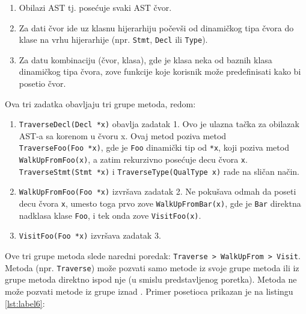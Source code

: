 \documentclass[12pt,oneside]{memoir}
\begin{document}
\begin{enumerate}
\item Obilazi AST tj. posećuje svaki AST čvor.
\item Za dati čvor ide uz klasnu hijerarhiju počevši od dinamičkog tipa čvora do klase na vrhu hijerarhije (npr. \lstinline{Stmt}, \lstinline{Decl} ili \lstinline{Type}).
\item Za datu kombinaciju (čvor, klasa), gde je klasa neka od baznih klasa dinamičkog tipa čvora, zove funkcije koje korisnik može predefinisati kako bi posetio čvor.
\end{enumerate}
Ova tri zadatka obavljaju tri grupe metoda, redom:
\begin{enumerate}
  \item \lstinline{TraverseDecl(Decl *x)} obavlja zadatak 1. Ovo je ulazna tačka za obilazak AST-a sa korenom u čvoru x. Ovaj metod poziva metod \\ \lstinline{TraverseFoo(Foo *x)}, gde je \lstinline{Foo} dinamički tip od \lstinline{*x}, koji poziva metod \lstinline{WalkUpFromFoo(x)}, a zatim rekurzivno posećuje decu čvora \lstinline{x}. \\ \lstinline{TraverseStmt(Stmt *x)} i \lstinline{TraverseType(QualType x)} rade na sličan način.
 
\item \lstinline{WalkUpFromFoo(Foo *x)} izvršava zadatak 2. Ne pokušava odmah da poseti decu čvora \lstinline{x}, umesto toga prvo zove \lstinline{WalkUpFromBar(x)}, gde je \lstinline{Bar} direktna nadklasa klase \lstinline{Foo}, i tek onda zove \lstinline{VisitFoo(x)}.
\item \lstinline{VisitFoo(Foo *x)} izvršava zadatak 3.
\end{enumerate}
Ove tri grupe metoda slede naredni poredak: \lstinline{Traverse > WalkUpFrom > Visit}. Metoda (npr. \lstinline{Traverse}) može pozvati samo metode iz svoje grupe metoda ili iz grupe metoda direktno ispod nje (u smislu predstavljenog poretka). Metoda ne može pozvati metode iz grupe iznad \cite{visitors}.
Primer posetioca prikazan je na listingu \ref{lst:label6}:
\end{document}

